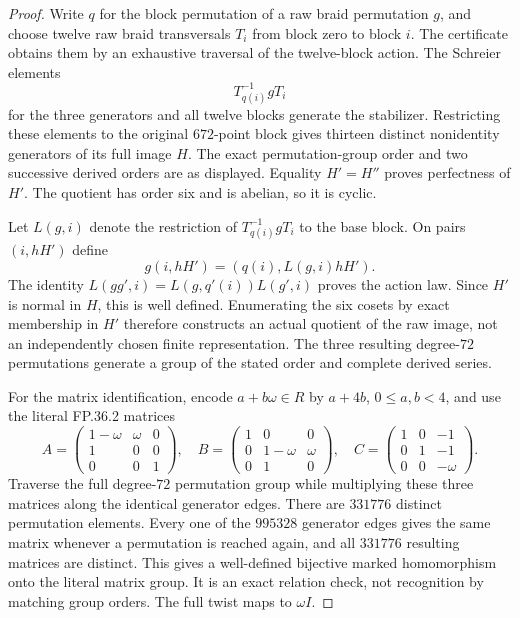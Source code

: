 \begin{proof}
Write $q$ for the block permutation of a raw braid permutation
$g$, and choose twelve raw braid transversals $T_i$ from block
zero to block $i$. The certificate obtains them by an exhaustive
traversal of the twelve-block action. The Schreier elements
\[
                       T_{q(i)}^{-1}gT_i
\]
for the three generators and all twelve blocks generate the
stabilizer. Restricting these elements to the original $672$-point
block gives thirteen distinct nonidentity generators of its full
image $H$. The exact permutation-group order and two successive
derived orders are as displayed. Equality $H'=H''$ proves
perfectness of $H'$. The quotient has order six and is abelian,
so it is cyclic.

Let $L(g,i)$ denote the restriction of
$T_{q(i)}^{-1}gT_i$ to the base block. On pairs $(i,hH')$ define
\[
                  g(i,hH')=(q(i),L(g,i)hH').
\]
The identity
$L(gg',i)=L(g,q'(i))L(g',i)$ proves the action law.
Since $H'$ is normal in $H$, this is well defined. Enumerating
the six cosets by exact membership in $H'$ therefore constructs
an actual quotient of the raw image, not an independently chosen
finite representation. The three resulting degree-$72$
permutations generate a group of the stated order and complete
derived series.

For the matrix identification, encode $a+b\omega\in R$ by
$a+4b$, $0\leq a,b<4$, and use the literal FP.36.2 matrices
\[
 A=\begin{pmatrix}1-\omega&\omega&0\\1&0&0\\0&0&1\end{pmatrix},
 \quad B=\begin{pmatrix}1&0&0\\0&1-\omega&\omega\\0&1&0\end{pmatrix},
 \quad C=\begin{pmatrix}1&0&-1\\0&1&-1\\0&0&-\omega\end{pmatrix}.
\]
Traverse the full degree-$72$ permutation group while multiplying
these three matrices along the identical generator edges. There
are $331776$ distinct permutation elements. Every one of the
$995328$ generator edges gives the same matrix whenever a
permutation is reached again, and all $331776$ resulting
matrices are distinct. This gives a well-defined bijective marked
homomorphism onto the literal matrix group. It is an exact
relation check, not recognition by matching group orders.
The full twist maps to $\omega I$.


\end{proof}
